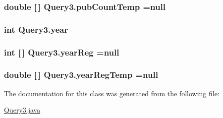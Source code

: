 \subsubsection[{\texorpdfstring{pub\+Count\+Temp}{pubCountTemp}}]{\setlength{\rightskip}{0pt plus 5cm}double \mbox{[}$\,$\mbox{]} Query3.\+pub\+Count\+Temp =null\hspace{0.3cm}{\ttfamily [private]}}\hypertarget{classQuery3_aa4820280feefd8ebe9c04b42b73c8f52}{}\label{classQuery3_aa4820280feefd8ebe9c04b42b73c8f52}
\subsubsection[{\texorpdfstring{year}{year}}]{\setlength{\rightskip}{0pt plus 5cm}int Query3.\+year\hspace{0.3cm}{\ttfamily [private]}}\hypertarget{classQuery3_a0bae9f7c878eeda85345866f6983caae}{}\label{classQuery3_a0bae9f7c878eeda85345866f6983caae}
\subsubsection[{\texorpdfstring{year\+Reg}{yearReg}}]{\setlength{\rightskip}{0pt plus 5cm}int \mbox{[}$\,$\mbox{]} Query3.\+year\+Reg =null\hspace{0.3cm}{\ttfamily [private]}}\hypertarget{classQuery3_ada9c7e6f4d53607da9450738b76dbc7d}{}\label{classQuery3_ada9c7e6f4d53607da9450738b76dbc7d}
\subsubsection[{\texorpdfstring{year\+Reg\+Temp}{yearRegTemp}}]{\setlength{\rightskip}{0pt plus 5cm}double \mbox{[}$\,$\mbox{]} Query3.\+year\+Reg\+Temp =null\hspace{0.3cm}{\ttfamily [private]}}\hypertarget{classQuery3_a8357a655699bb076c9174af9c95f00b1}{}\label{classQuery3_a8357a655699bb076c9174af9c95f00b1}


The documentation for this class was generated from the following file\+:\begin{DoxyCompactItemize}
\item 
\hyperlink{Query3_8java}{Query3.\+java}\end{DoxyCompactItemize}
